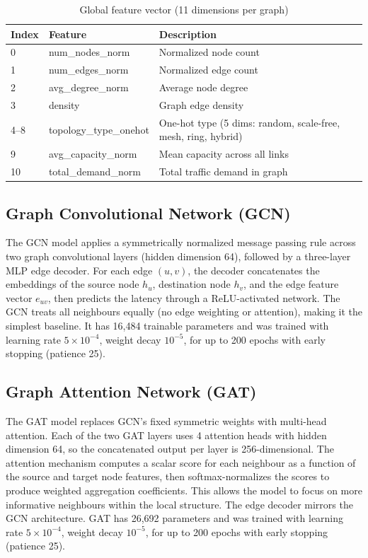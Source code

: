\documentclass[12pt]{article}
\begin{document}
\begin{table}[h]
\centering
\caption{Global feature vector (11 dimensions per graph)}
\begin{tabular}{lll}
\toprule
\textbf{Index} & \textbf{Feature} & \textbf{Description} \\
\midrule
0 & num\_nodes\_norm & Normalized node count \\
1 & num\_edges\_norm & Normalized edge count \\
2 & avg\_degree\_norm & Average node degree \\
3 & density & Graph edge density \\
4--8 & topology\_type\_onehot & One-hot type (5 dims: random, scale-free, mesh, ring, hybrid) \\
9 & avg\_capacity\_norm & Mean capacity across all links \\
10 & total\_demand\_norm & Total traffic demand in graph \\
\bottomrule
\end{tabular}
\end{table}

\subsection{Graph Convolutional Network (GCN)}
The GCN model \cite{gcnKipf} applies a symmetrically normalized message passing rule across two graph convolutional layers (hidden dimension 64), followed by a three-layer MLP edge decoder. For each edge $(u, v)$, the decoder concatenates the embeddings of the source node $h_u$, destination node $h_v$, and the edge feature vector $e_{uv}$, then predicts the latency through a ReLU-activated network. The GCN treats all neighbours equally (no edge weighting or attention), making it the simplest baseline. It has 16,484 trainable parameters and was trained with learning rate $5 \times 10^{-4}$, weight decay $10^{-5}$, for up to 200 epochs with early stopping (patience 25).

\subsection{Graph Attention Network (GAT)}
The GAT model \cite{gatVelickovic} replaces GCN's fixed symmetric weights with multi-head attention. Each of the two GAT layers uses 4 attention heads with hidden dimension 64, so the concatenated output per layer is 256-dimensional. The attention mechanism computes a scalar score for each neighbour as a function of the source and target node features, then softmax-normalizes the scores to produce weighted aggregation coefficients. This allows the model to focus on more informative neighbours within the local structure. The edge decoder mirrors the GCN architecture. GAT has 26,692 parameters and was trained with learning rate $5 \times 10^{-4}$, weight decay $10^{-5}$, for up to 200 epochs with early stopping (patience 25).
\end{document}
